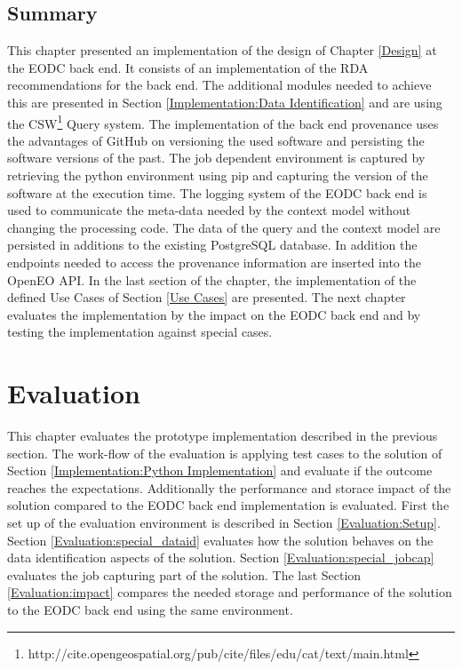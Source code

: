 \documentclass[draft,final]{vutinfth} %
\begin{document}
\section{Summary}
This chapter presented an implementation of the design of Chapter \ref{Design} at the EODC back end. It consists of an implementation of the RDA recommendations for the back end. The additional modules needed to achieve this are presented in Section \ref{Implementation:Data Identification} and are using the CSW\footnote{http://cite.opengeospatial.org/pub/cite/files/edu/cat/text/main.html} Query system. The implementation of the back end provenance uses the advantages of GitHub on versioning the used software and persisting the software versions of the past. The job dependent environment is captured by retrieving the python environment using pip and capturing the version of the software at the execution time. The logging system of the EODC back end is used to communicate the meta-data needed by the context model without changing the processing code. The data of the query and the context model are persisted in additions to the existing PostgreSQL database. In addition the endpoints needed to access the provenance information are inserted into the OpenEO API. In the last section of the chapter, the implementation of the defined Use Cases of Section \ref{Use Cases} are presented. The next chapter evaluates the implementation by the impact on the EODC back end and by testing the implementation against special cases.    
\chapter{Evaluation}\label{Evaluation}
This chapter evaluates the prototype implementation described in the previous section. The work-flow of the evaluation is applying test cases to the solution of Section \ref{Implementation:Python Implementation} and evaluate if the outcome reaches the expectations. Additionally the performance and storace impact of the solution compared to the EODC back end implementation is evaluated. First the set up of the evaluation environment is described in Section \ref{Evaluation:Setup}. Section \ref{Evaluation:special_dataid} evaluates how the solution behaves on the data identification aspects of the solution. Section \ref{Evaluation:special_jobcap} evaluates the job capturing part of the solution. The last Section \ref{Evaluation:impact} compares the needed storage and performance of the solution to the EODC back end using the same environment. 
\end{document}
